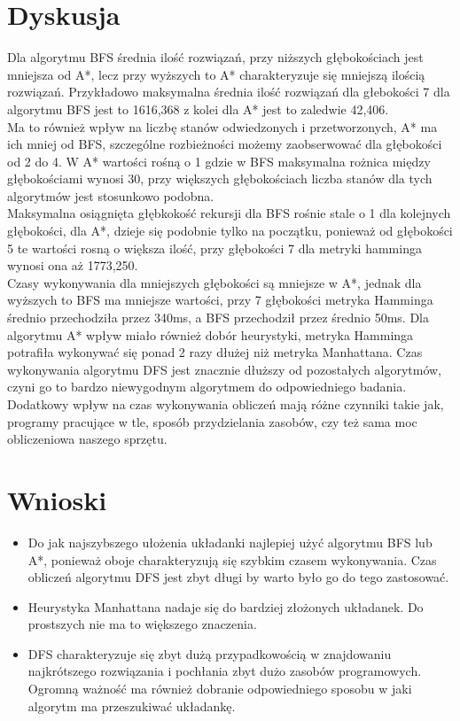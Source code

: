 \documentclass{classrep}
\begin{document}
\section{Dyskusja}
{
	Dla algorytmu BFS średnia ilość rozwiązań, przy niższych głębokościach jest mniejsza od A*, lecz przy wyższych to A* charakteryzuje się mniejszą ilością rozwiązań. 
Przykładowo maksymalna średnia ilość rozwiązań dla głebokości 7 dla algorytmu BFS jest to 1616,368 z kolei dla A* jest to zaledwie 42,406.
 \\	Ma to również wpływ na liczbę stanów odwiedzonych i przetworzonych, A* ma ich mniej od BFS, szczególne rozbieżności możemy zaobserwować dla głębokości od 2 do 4. W A* wartości rośną o 1 gdzie w BFS maksymalna rożnica między głębokościami wynosi 30, przy większych głębokościach liczba stanów dla tych algorytmów jest stosunkowo podobna.
\\ 	Maksymalna osiągnięta głębkokość rekursji dla BFS rośnie stale o 1 dla kolejnych głębokości, dla A*, dzieje się podobnie tylko na początku, ponieważ od głębokości 5 te wartości rosną o większa ilość, przy głębokości 7 dla metryki hamminga wynosi ona aż 1773,250.
\\	Czasy wykonywania dla mniejszych głębokości są mniejsze w A*, jednak dla wyższych to BFS ma mniejsze wartości, przy 7 głębokości metryka Hamminga średnio przechodziła przez 340ms, a BFS przechodził przez średnio 50ms. Dla algorytmu A* wpływ miało również dobór heurystyki, metryka Hamminga potrafiła wykonywać się ponad 2 razy dłużej niż metryka Manhattana. Czas wykonywania algorytmu DFS jest znacznie dłuższy od pozostałych algorytmów, czyni go to bardzo niewygodnym algorytmem do odpowiedniego badania. Dodatkowy wpływ na czas wykonywania obliczeń mają różne czynniki takie jak, programy pracujące w tle,
sposób przydzielania zasobów, czy też sama moc obliczeniowa naszego sprzętu.
}

\section{Wnioski}
{
\begin{itemize}
	\item Do jak najszybszego ułożenia układanki najlepiej użyć algorytmu BFS lub A*, ponieważ oboje charakteryzują się szybkim czasem wykonywania. Czas obliczeń algorytmu DFS jest zbyt długi by warto było go do tego zastosować.
	\item Heurystyka Manhattana nadaje się do bardziej złożonych układanek. Do prostszych nie ma to większego znaczenia.
	\item DFS charakteryzuje się zbyt dużą przypadkowością w znajdowaniu najkrótszego rozwiązania i pochłania zbyt dużo zasobów programowych. Ogromną ważność ma również dobranie odpowiedniego sposobu w jaki algorytm ma przeszukiwać układankę.
\end{itemize}
}
\end{document}

